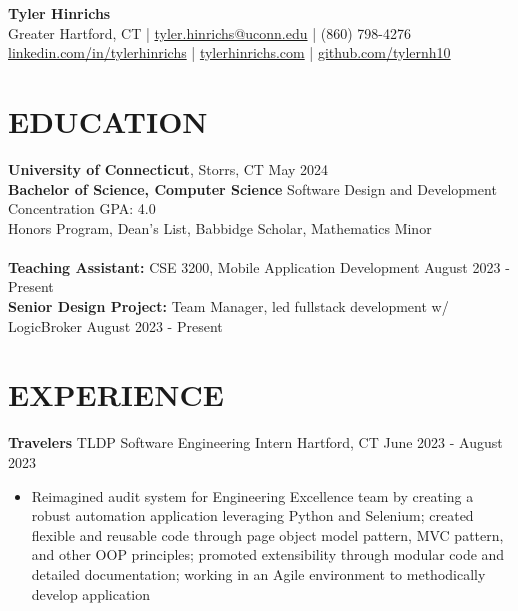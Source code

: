 \documentclass[a4paper,10pt]{extarticle}
\begin{document}
\pagestyle{empty}

\begin{center}
\textbf{\Large Tyler Hinrichs}\\[2pt] %
Greater Hartford, CT | \href{mailto:tyler.hinrichs@uconn.edu}{tyler.hinrichs@uconn.edu} | (860) 798-4276\\ \href{https://www.linkedin.com/in/tylerhinrichs}{linkedin.com/in/tylerhinrichs} | \href{https://tylerhinrichs.com}{tylerhinrichs.com} | \href{https://github.com/tylernh10}{github.com/tylernh10} %
\end{center}

\section*{EDUCATION}
\noindent
\textbf{University of Connecticut}, Storrs, CT \hfill May 2024\\ %
\textbf{Bachelor of Science, Computer Science} \textbar \space Software Design and Development Concentration \hfill GPA: 4.0\\ %
Honors Program, Dean’s List, Babbidge Scholar, Mathematics Minor \\
\\
\textbf{Teaching Assistant:} CSE 3200, Mobile Application Development \hfill August 2023 - Present \\
\textbf{Senior Design Project:} Team Manager, led fullstack development w/ LogicBroker \hfill August 2023 - Present


\section*{EXPERIENCE}
\noindent
\textbf{Travelers} \textbar \space TLDP Software Engineering Intern \hfill Hartford, CT \textbar \space June 2023 - August 2023 %
\begin{itemize}
    \item Reimagined audit system for Engineering Excellence team by creating a robust automation application leveraging Python and Selenium; created flexible and reusable code through page object model pattern, MVC pattern, and other OOP principles; promoted extensibility through modular code and detailed documentation; working in an Agile environment to methodically develop application %
\end{itemize}
\end{document}
